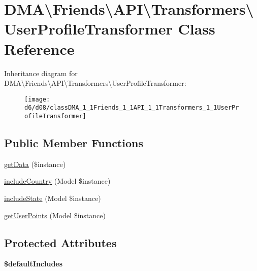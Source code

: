 \hypertarget{classDMA_1_1Friends_1_1API_1_1Transformers_1_1UserProfileTransformer}{}\section{D\+M\+A\textbackslash{}Friends\textbackslash{}A\+P\+I\textbackslash{}Transformers\textbackslash{}User\+Profile\+Transformer Class Reference}
\label{classDMA_1_1Friends_1_1API_1_1Transformers_1_1UserProfileTransformer}
Inheritance diagram for D\+M\+A\textbackslash{}Friends\textbackslash{}A\+P\+I\textbackslash{}Transformers\textbackslash{}User\+Profile\+Transformer\+:\begin{figure}[H]
\begin{center}
\leavevmode
\texttt{[image: d6/d08/classDMA\_1\_1Friends\_1\_1API\_1\_1Transformers\_1\_1UserProfileTransformer]}
\end{center}
\end{figure}
\subsection*{Public Member Functions}
\begin{DoxyCompactItemize}
\item 
\hyperlink{classDMA_1_1Friends_1_1API_1_1Transformers_1_1UserProfileTransformer_ada552f9a08e428c52c044ca8e7abc915}{get\+Data} (\$instance)
\item 
\hyperlink{classDMA_1_1Friends_1_1API_1_1Transformers_1_1UserProfileTransformer_aaea113bbd8cf8bd53b6ef3530d3fc07a}{include\+Country} (Model \$instance)
\item 
\hyperlink{classDMA_1_1Friends_1_1API_1_1Transformers_1_1UserProfileTransformer_accd7c7ec420193cbaa6077b26aa8d292}{include\+State} (Model \$instance)
\item 
\hyperlink{classDMA_1_1Friends_1_1API_1_1Transformers_1_1UserProfileTransformer_a8e0d4c0e3e2f424792f857292abb0710}{get\+User\+Points} (Model \$instance)
\end{DoxyCompactItemize}
\subsection*{Protected Attributes}
\begin{DoxyCompactItemize}
\item 
{\bfseries \$default\+Includes}
\end{DoxyCompactItemize}
